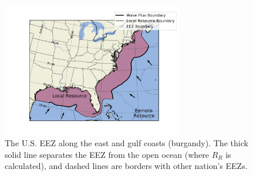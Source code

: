 \begin{figure}
    \centering
    \includegraphics[width=0.7\textwidth]{../fig/at_EEZ_resourcePlot}
    \caption{The U.S. EEZ along the east and gulf coasts (burgandy). The thick solid line separates the EEZ from the open ocean (where $R_R$ is calculated), and dashed lines are borders with other nation's EEZs.}
    \label{fig:at-EEZ}
\end{figure}


